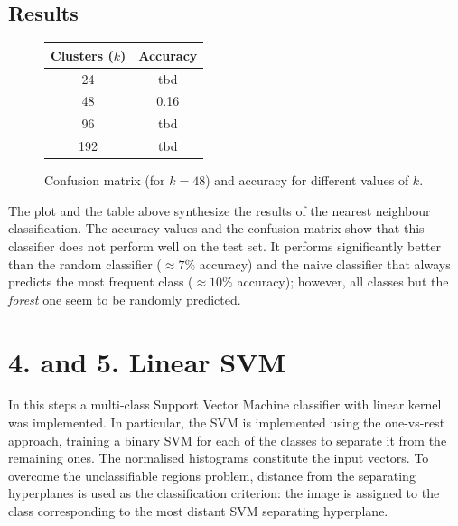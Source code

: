 \documentclass[12pt]{article}
\begin{document}
  \subsection*{Results}

  \begin{figure}[H]
    \centering
    \caption*{Confusion matrix (for \( k = 48 \)) and accuracy for different values of \( k \).}
    \quad\quad\quad
    \begin{tabular}[b]{cc}
			\toprule
      Clusters (\( k \)) & Accuracy \\
      \midrule
      24  & tbd \\
      48  & 0.16 \\
      96  & tbd \\
      192 & tbd \\
      \bottomrule
    \end{tabular}
  \end{figure}

  The plot and the table above synthesize the results of the nearest neighbour classification. The accuracy values and the confusion matrix show that this classifier does not perform well on the test set. It performs significantly better than the random classifier (\( \approx 7\% \) accuracy) and the naive classifier that always predicts the most frequent class (\( \approx 10\% \) accuracy); however, all classes but the \textit{forest} one seem to be randomly predicted.



  \section*{4. and 5. Linear SVM}

  In this steps a multi-class Support Vector Machine classifier with linear kernel was implemented. In particular, the SVM is implemented using the one-vs-rest approach, training a binary SVM for each of the classes to separate it from the remaining ones. The normalised histograms constitute the input vectors. To overcome the unclassifiable regions problem, distance from the separating hyperplanes is used as the classification criterion: the image is assigned to the class corresponding to the most distant SVM separating hyperplane.
\end{document}
